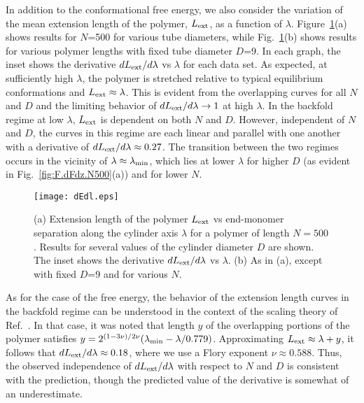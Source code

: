 \documentclass[journal=mamobx,manuscript=article,layout=twocolumn]{achemso}
\begin{document}
In addition to the conformational free energy, we also consider the variation
of the mean extension length of the polymer, $L_{\rm ext}$, as a function of
$\lambda$.  Figure~\ref{n500_len}(a) shows results for $N$=500 for various tube 
diameters, while Fig.~\ref{n500_len}(b) shows results for various polymer lengths 
with fixed tube diameter $D$=9. In each graph, the inset shows the derivative 
$dL_{\rm ext}/d\lambda$ vs $\lambda$ for each data set.  As expected, at sufficiently 
high $\lambda$, the polymer is stretched relative to typical equilibrium conformations 
and $L_{\rm ext} \approx \lambda$. This is evident from the overlapping curves for all 
$N$ and $D$ and the limiting behavior of $dL_{\rm ext}/d\lambda\rightarrow 1$ at
high $\lambda$. In the backfold regime at low $\lambda$, $L_{\rm ext}$ is dependent
on both $N$ and $D$. However, independent of $N$ and $D$, the curves in this regime 
are each linear and parallel with one another with a derivative of 
$dL_{\rm ext}/d\lambda\approx 0.27$. The transition between the two regimes occurs
in the vicinity of $\lambda \approx \lambda_{\rm min}$, which lies at lower
$\lambda$ for higher $D$ (as evident in Fig.~\ref{fig:F.dFdz.N500}(a)) and for
lower $N$.

\begin{figure}[!ht]
\begin{center}
\texttt{[image: dEdl.eps]}
\end{center}
\caption{
(a) Extension length of the polymer $L_{\rm ext}$ vs end-monomer separation
along the cylinder axis $\lambda$ for a polymer of length $N=500$.
Results for several values of the cylinder diameter $D$ are shown.
The inset shows the derivative $dL_{\rm ext}/d\lambda$ vs $\lambda$.
(b) As in (a), except with fixed $D$=9 and for various $N$.
}
\label{n500_len}
\end{figure}

As for the case of the free energy, the behavior of the extension length curves in 
the backfold regime can be understood in the context of the scaling theory of 
Ref.~. In that case, it was noted that length $y$ of the 
overlapping portions of the polymer satisfies
$y = 2^{(1-3\nu)/2\nu}(\lambda_{\rm min} - \lambda/0.779)$.
Approximating $L_{\rm ext}\approx \lambda + y$, it follows that 
$dL_{\rm ext}/d\lambda \approx 0.18$, where we use a Flory exponent $\nu\approx 0.588$.
Thus, the observed independence  of $dL_{\rm ext}/d\lambda$ with respect to $N$ and $D$ 
is consistent with the prediction, though the predicted value of the derivative 
is somewhat of an underestimate.
\end{document}
